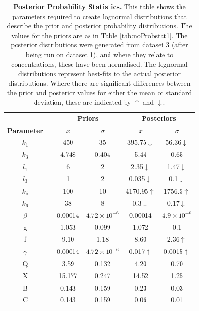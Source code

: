\begin{table}[tbp]%
\renewcommand{\arraystretch}{1.5}
\begin{center}
\begin{tabular}{cccccc}
\toprule
& & \multicolumn{2}{c}{\textbf{Priors}} & \multicolumn{2}{c}{\textbf{Posteriors}} \\
\textbf{Parameter} && ${\bar{x}}$ & $\sigma$ & ${\bar{x}}$ & $\sigma$\\
\midrule
$k_1$ && 450 & 35 & 395.75$\downarrow$ & 56.36$\downarrow$\\
$k_3$ && 4.748 & 0.404 & 5.44 & 0.65\\
$l_1$ && 6 & 2 & 2.35$\downarrow$ & 1.47$\downarrow$\\
$l_3$ && 1 & 2 & 0.035$\downarrow$ & 0.1$\downarrow$\\
$k_5$ && 100 & 10 & 4170.95$\uparrow$ & 1756.5$\uparrow$\\
$k_6$ && 38 & 8 & 0.3$\downarrow$ & 0.17$\downarrow$\\
$\beta$ && 0.00014 & $4.72\times 10^{-6}$ & 0.00014 & $4.9\times 10^{-6}$\\
g && 1.053 & 0.099 & 1.072 & 0.1\\
f && 9.10 & 1.18 & 8.60 & 2.36$\uparrow$\\
$\gamma$ && 0.00014 & $4.72\times 10^{-6}$ & 0.017$\uparrow$ & 0.0015$\uparrow$\\
Q && 3.59 & 0.132 & 4.20 & 0.70\\
X && 15.177 & 0.247 & 14.52 & 1.25\\
B && 0.143 & 0.159 & 0.23 & 0.03\\
C && 0.143 & 0.159 & 0.06 & 0.01\\
\bottomrule
\end{tabular}
\end{center}
\caption[Posterior Probability Statistics]{{\bf Posterior Probability Statistics.} This table shows the parameters required to create lognormal distributions that describe the prior and posterior probability distributions. The values for the priors are as in Table \ref{tab:noProbstat1}. The posterior distributions were generated from dataset 3 (after being run on dataset 1), and where they relate to concentrations, these have been normalised. The lognormal distributions represent best-fits to the actual posterior distributions. Where there are significant differences between the prior and posterior values for either the mean or standard deviation, these are indicated by $\uparrow$ and $\downarrow$.
\label{tab:noPstat}}
\end{table}

